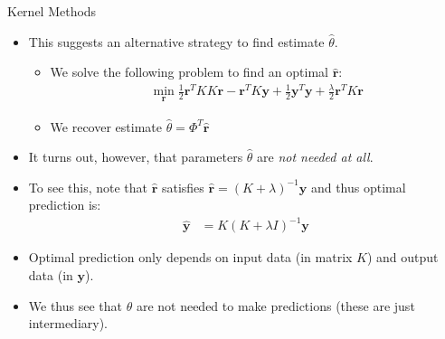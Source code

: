 \documentclass[9pt]{beamer}
\begin{document}
\begin{frame}{Kernel Methods}
\begin{itemize}
  \setlength{\itemsep}{10pt}
\item This suggests an alternative strategy to find estimate $\hat{\theta}$. 
\begin{itemize}
\item We solve the following problem to find an optimal $\hat{\mathbf{r}}$: 
\begin{align*}
\min_{\mathbf{r}} \frac{1}{2}\mathbf{r}^TKK\mathbf{r}-\mathbf{r}^TK\mathbf{y}+\frac{1}{2}\mathbf{y}^T\mathbf{y}+\frac{\lambda}{2}\mathbf{r}^TK\mathbf{r}
\end{align*}
\item We recover estimate $\hat{\theta}=\Phi^T\hat{\mathbf{r}}$
\end{itemize}
\item It turns out, however, that parameters $\hat{\theta}$ are {\em not needed at all}. 
\item To see this, note that $\hat{\mathbf{r}}$ satisfies $\hat{\mathbf{r}}=(K+\lambda)^{-1}\mathbf{y}$ and thus optimal prediction is:
\begin{align*}
\hat{\mathbf{y}}&= K(K+\lambda I)^{-1}\mathbf{y}
\end{align*}
\item Optimal prediction only depends on input data (in matrix $K$) and output data (in $\mathbf{y}$).  

\item We thus see that $\theta$ are not needed to make predictions (these are just intermediary). 

\end{itemize}

\end{frame}

\end{document}
